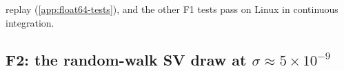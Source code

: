 replay (\cref{app:float64-tests}), and the other F1 tests pass
on Linux in continuous integration. %

\subsection[F2: the random-walk SV draw at a tiny sigma]{F2: the random-walk SV draw at $\sigma \approx 5\times10^{-9}$}\label{sec:robustness-f2}

